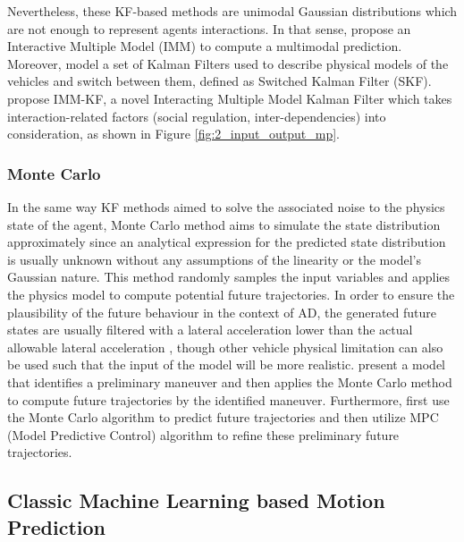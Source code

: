 Nevertheless, these KF-based methods are unimodal Gaussian distributions which are not enough to represent agents interactions. In that sense, \cite{kaempchen2004imm} propose an Interactive Multiple Model (IMM) to compute a multimodal prediction. Moreover, \cite{jin2015switched} model a set of Kalman Filters used to describe physical models of the vehicles and switch between them, defined as Switched Kalman Filter (SKF). \cite{lefkopoulos2020interaction} propose IMM-KF, a novel Interacting Multiple Model Kalman Filter which takes interaction-related factors (social regulation, inter-dependencies) into consideration, as shown in Figure \ref{fig:2_input_output_mp}.

\subsubsection{Monte Carlo}
\label{subsubsec:2_monte_carlo_mp}

In the same way KF methods aimed to solve the associated noise to the physics state of the agent, Monte Carlo method aims to simulate the state distribution approximately since an analytical expression for the predicted state distribution is usually unknown without any assumptions of the linearity or the model’s Gaussian nature. This method randomly samples the input variables and applies the physics model to compute potential future trajectories. In order to ensure the plausibility of the future behaviour in the context of \ac{AD}, the generated future states are usually filtered with a lateral acceleration lower than the actual allowable lateral acceleration \cite{broadhurst2005monte}, though other vehicle physical limitation can also be used such that the input of the model will be more realistic. \cite{okamoto2017driver} present a model that identifies a preliminary maneuver and then applies the Monte Carlo method to compute future trajectories by the identified maneuver. Furthermore, \cite{wang2019trajectory} first use the Monte Carlo algorithm to predict future trajectories and then utilize MPC (Model Predictive Control) algorithm to refine these preliminary future trajectories.

\subsection{Classic Machine Learning based Motion Prediction}
\label{sec:2_ml_based_mp}

